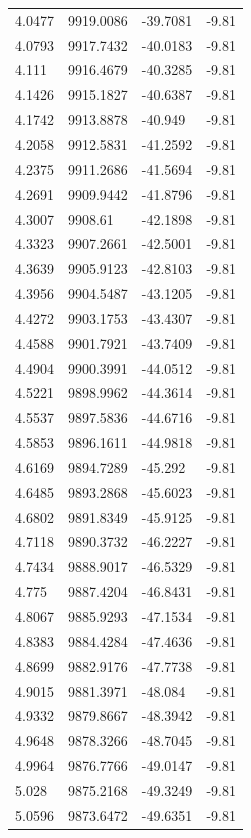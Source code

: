 \begin{table}[H]
\begin{tabular}{llll}
4.0477 & 9919.0086 & -39.7081 & -9.81 \\
4.0793 & 9917.7432 & -40.0183 & -9.81 \\
4.111 & 9916.4679 & -40.3285 & -9.81 \\
4.1426 & 9915.1827 & -40.6387 & -9.81 \\
4.1742 & 9913.8878 & -40.949 & -9.81 \\
4.2058 & 9912.5831 & -41.2592 & -9.81 \\
4.2375 & 9911.2686 & -41.5694 & -9.81 \\
4.2691 & 9909.9442 & -41.8796 & -9.81 \\
4.3007 & 9908.61 & -42.1898 & -9.81 \\
4.3323 & 9907.2661 & -42.5001 & -9.81 \\
4.3639 & 9905.9123 & -42.8103 & -9.81 \\
4.3956 & 9904.5487 & -43.1205 & -9.81 \\
4.4272 & 9903.1753 & -43.4307 & -9.81 \\
4.4588 & 9901.7921 & -43.7409 & -9.81 \\
4.4904 & 9900.3991 & -44.0512 & -9.81 \\
4.5221 & 9898.9962 & -44.3614 & -9.81 \\
4.5537 & 9897.5836 & -44.6716 & -9.81 \\
4.5853 & 9896.1611 & -44.9818 & -9.81 \\
4.6169 & 9894.7289 & -45.292 & -9.81 \\
4.6485 & 9893.2868 & -45.6023 & -9.81 \\
4.6802 & 9891.8349 & -45.9125 & -9.81 \\
4.7118 & 9890.3732 & -46.2227 & -9.81 \\
4.7434 & 9888.9017 & -46.5329 & -9.81 \\
4.775 & 9887.4204 & -46.8431 & -9.81 \\
4.8067 & 9885.9293 & -47.1534 & -9.81 \\
4.8383 & 9884.4284 & -47.4636 & -9.81 \\
4.8699 & 9882.9176 & -47.7738 & -9.81 \\
4.9015 & 9881.3971 & -48.084 & -9.81 \\
4.9332 & 9879.8667 & -48.3942 & -9.81 \\
4.9648 & 9878.3266 & -48.7045 & -9.81 \\
4.9964 & 9876.7766 & -49.0147 & -9.81 \\
5.028 & 9875.2168 & -49.3249 & -9.81 \\
5.0596 & 9873.6472 & -49.6351 & -9.81 \\

\end{tabular}
\end{table}
